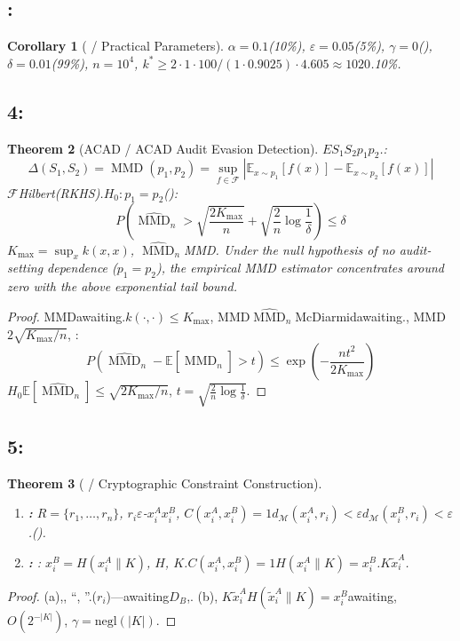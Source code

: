 \documentclass[11pt,a4paper]{article}
\theoremstyle{plain}
\newtheorem{theorem}{Theorem}[section]
\newtheorem{corollary}[theorem]{Corollary}
\theoremstyle{definition}
\theoremstyle{remark}
\newcommand{\EE}{\mathbb{E}}
\newcommand{\cM}{\mathcal{M}}
\newcommand{\cF}{\mathcal{F}}
\DeclareMathOperator{\MMD}{MMD}
\begin{document}
{\subsection{:}
\begin{corollary}[ / Practical Parameters]
\label{cor:acad-practical}
$\alpha = 0.1$(10\%), $\varepsilon = 0.05$(5\%), $\gamma = 0$(), $\delta = 0.01$(99\%), $n = 10^4$, $k^* \geq 2 \cdot 1 \cdot 100 / (1 \cdot 0.9025) \cdot 4.605 \approx 1020$.10\%.
\end{corollary}
\subsection{4:}
\begin{theorem}[ACAD / ACAD Audit Evasion Detection]
\label{thm:acad-mm}
$E$$S_1$$S_2$$p_1$$p_2$.: 
\begin{equation}
 \Delta(S_1, S_2) = \MMD(p_1, p_2) = \sup_{f \in \cF} \left| \EE_{x \sim p_1}[f(x)] - \EE_{x \sim p_2}[f(x)] \right|
\end{equation}
$\cF$Hilbert(RKHS).$H_0: p_1 = p_2$(): 
\begin{equation}
\boxed{P\left(\widehat{\MMD}_n > \sqrt{\frac{2K_{\max}}{n}} + \sqrt{\frac{2}{n}\log\frac{1}{\delta}} \right) \leq \delta}
\end{equation}
$K_{\max} = \sup_x k(x, x)$, $\widehat{\MMD}_n$MMD.
\textit{Under the null hypothesis of no audit-setting dependence ($p_1 = p_2$), the empirical MMD estimator concentrates around zero with the above exponential tail bound.}
\end{theorem}
\begin{proof}
MMDawaiting.$k(\cdot, \cdot) \leq K_{\max}$, MMD$\widehat{\MMD}_n$McDiarmidawaiting., MMD$2\sqrt{K_{\max}/n}$, : 
\begin{equation}
 P\left(\widehat{\MMD}_n - \EE[\widehat{\MMD}_n] > t\right) \leq \exp\left(-\frac{nt^2}{2K_{\max}}\right)
\end{equation}
$H_0$$\EE[\widehat{\MMD}_n] \leq \sqrt{2K_{\max}/n}$, $t = \sqrt{\frac{2}{n}\log\frac{1}{\delta}}$.
\end{proof}
\subsection{5:}
\begin{theorem}[ / Cryptographic Constraint Construction]
\label{thm:acad-constraint}
\begin{enumerate}[leftmargin=*, label=(\alph*)]
 \item \textbf{: } $R = \{r_1, \ldots, r_n\}$, $r_i$$\varepsilon$-$x_i^A$$x_i^B$, $C(x_i^A, x_i^B) = 1$$d_{\cM}(x_i^A, r_i) < \varepsilon$$d_{\cM}(x_i^B, r_i) < \varepsilon$.().
 \item \textbf{: } : $x_i^B = H(x_i^A \| K)$, $H$, $K$.$C(x_i^A, x_i^B) = 1$$H(x_i^A \| K) = x_i^B$.$K$$\tilde{x}_i^A$.
\end{enumerate}
\end{theorem}
\begin{proof}
(a),, ``, ''.($r_i$)---awaiting$D_B$,.
(b), $K$$\tilde{x}_i^A$$H(\tilde{x}_i^A \| K) = x_i^B$awaiting, $O(2^{-|K|})$, $\gamma = \text{negl}(|K|)$.
\end{proof}
}
\end{document}
